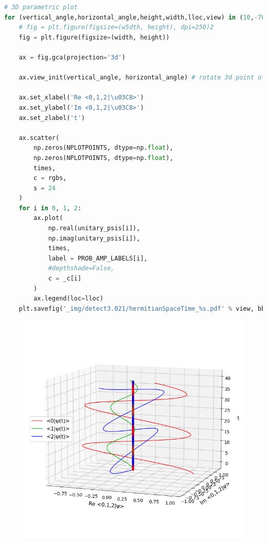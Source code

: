 \begin{lstlisting}[language=Python]
# 3D parametric plot
for (vertical_angle,horizontal_angle,height,width,lloc,view) in (10,-70,12,12,'center left','side'), (80,-120,12,12,'right','top'):
    # fig = plt.figure(figsize=(w5dth, height), dpi=250)2
    fig = plt.figure(figsize=(width, height))

    ax = fig.gca(projection='3d')

    ax.view_init(vertical_angle, horizontal_angle) # rotate 3d point of view

    ax.set_xlabel('Re <0,1,2|\u03C8>')
    ax.set_ylabel('Im <0,1,2|\u03C8>')
    ax.set_zlabel('t')

    ax.scatter(
        np.zeros(NPLOTPOINTS, dtype=np.float),
        np.zeros(NPLOTPOINTS, dtype=np.float),
        times,
        c = rgbs,
        s = 24
    )
    for i in 0, 1, 2:
        ax.plot(
            np.real(unitary_psis[i]),
            np.imag(unitary_psis[i]),
            times,
            label = PROB_AMP_LABELS[i],
            #depthshade=False,
            c = _c[i]
        )
        ax.legend(loc=lloc)
    plt.savefig('_img/detect3.021/hermitianSpaceTime_%s.pdf' % view, bbox_inches=0, pad_inches=0)
\end{lstlisting}

\begin{figure}[h!]
\centering
\includegraphics[width=0.66\linewidth]{tex/appendix/nb/jupyter/3lev/output_25_0.png}

\end{figure}


